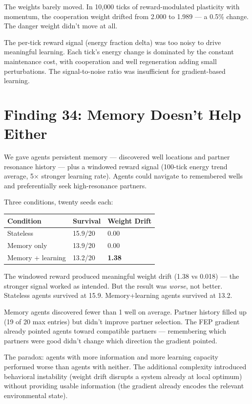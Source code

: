 The weights barely moved. In 10,000 ticks of reward-modulated plasticity with momentum, the cooperation weight drifted from 2.000 to 1.989 --- a 0.5\% change. The danger weight didn't move at all.

The per-tick reward signal (energy fraction delta) was too noisy to drive meaningful learning. Each tick's energy change is dominated by the constant maintenance cost, with cooperation and well regeneration adding small perturbations. The signal-to-noise ratio was insufficient for gradient-based learning.

\section{Finding 34: Memory Doesn't Help Either}\label{finding-34-memory-doesnt-help-either}

We gave agents persistent memory --- discovered well locations and partner resonance history --- plus a windowed reward signal (100-tick energy trend average, 5$\times$ stronger learning rate). Agents could navigate to remembered wells and preferentially seek high-resonance partners.

Three conditions, twenty seeds each:

\begin{longtable}[]{@{}lll@{}}
\toprule\noalign{}
Condition & Survival & Weight Drift \\
\midrule\noalign{}
\endhead
\bottomrule\noalign{}
\endlastfoot
Stateless & 15.9/20 & 0.00 \\
Memory only & 13.9/20 & 0.00 \\
Memory + learning & 13.2/20 & \textbf{1.38} \\
\end{longtable}

The windowed reward produced meaningful weight drift (1.38 vs 0.018) --- the stronger signal worked as intended. But the result was \emph{worse}, not better. Stateless agents survived at 15.9. Memory+learning agents survived at 13.2.

Memory agents discovered fewer than 1 well on average. Partner history filled up (19 of 20 max entries) but didn't improve partner selection. The FEP gradient already pointed agents toward compatible partners --- remembering which partners were good didn't change which direction the gradient pointed.

The paradox: agents with more information and more learning capacity performed worse than agents with neither. The additional complexity introduced behavioral instability (weight drift disrupts a system already at local optimum) without providing usable information (the gradient already encodes the relevant environmental state).

